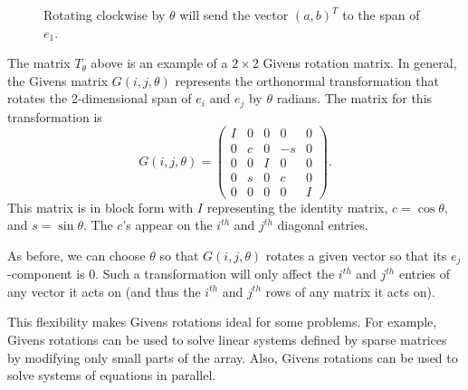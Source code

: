 \begin{figure}
\begin{center}
\caption{Rotating clockwise by $\theta$ will send the vector $(a,b)^T$ to the span of $e_1$.}
\label{fig:angle}
\end{center}
\end{figure}



The matrix $T_{\theta}$ above is an example of a $2 \times 2$ Givens rotation matrix. 
In general, the Givens matrix $G(i,j,\theta)$ represents the orthonormal transformation that rotates the 2-dimensional span of $e_i$ and $e_j$ by $\theta$ radians. 
The matrix for this transformation is
\begin{equation*}
G(i,j,\theta) = \begin{pmatrix}
I & 0 & 0 & 0 & 0 \\
0 & c & 0 & -s & 0 \\
0 & 0 & I & 0 & 0 \\
0 & s & 0 & c & 0 \\
0 & 0 & 0 & 0 & I
\end{pmatrix}.
\end{equation*}
This matrix is in block form with $I$ representing the identity matrix, $c=\cos \theta$, and $s=\sin \theta$. 
The $c$'s appear on the $i^{th}$ and $j^{th}$ diagonal entries. 

As before, we can choose $\theta$ so that $G(i,j,\theta)$ rotates a given vector so that its $e_j$-component is 0. 
Such a transformation will only affect the $i^{th}$ and $j^{th}$ entries of any vector it acts on (and thus the $i^{th}$ and $j^{th}$ rows of any matrix it acts on). 



This flexibility makes Givens rotations ideal for some problems.
For example, Givens rotations can be used to solve linear systems defined by sparse matrices by modifying only small parts of the array.
Also, Givens rotations can be used to solve systems of equations in parallel.

